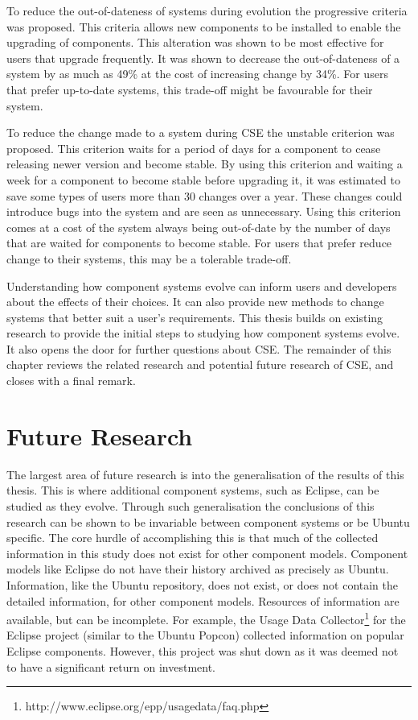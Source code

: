 To reduce the out-of-dateness of systems during evolution the progressive criteria was proposed.
This criteria allows new components to be installed to enable the upgrading of components.
This alteration was shown to be most effective for users that upgrade frequently.
It was shown to decrease the out-of-dateness of a system by as much as 49\% at the cost of increasing change by 34\%.
For users that prefer up-to-date systems, this trade-off might be favourable for their system.

To reduce the change made to a system during CSE the unstable criterion was proposed.
This criterion waits for a period of days for a component to cease releasing newer version and become stable.
By using this criterion and waiting a week for a component to become stable before upgrading it, it was estimated to save some types of users more than 30 changes over a year.
These changes could introduce bugs into the system and are seen as unnecessary. 
Using this criterion comes at a cost of the system always being out-of-date by the number of days that are waited for components to become stable.
For users that prefer reduce change to their systems, this may be a tolerable trade-off.

Understanding how component systems evolve can inform users and developers about the effects of their choices.
It can also provide new methods to change systems that better suit a user's requirements.
This thesis builds on existing research to provide the initial steps to studying how component systems evolve.
It also opens the door for further questions about CSE.
The remainder of this chapter reviews the related research and potential future research of CSE, and closes with a final remark. 

\section{Future Research}
The largest area of future research is into the generalisation of the results of this thesis.
This is where additional component systems, such as Eclipse, can be studied as they evolve. 
Through such generalisation the conclusions of this research can be shown to be invariable between component systems or be Ubuntu specific.
The core hurdle of accomplishing this is that much of the collected information in this study does not exist for other component models.
Component models like Eclipse do not have their history archived as precisely as Ubuntu.
Information, like the Ubuntu repository, does not exist, or does not contain the detailed information, for other component models.
Resources of information are available, but can be incomplete.
For example, the Usage Data Collector\footnote{http://www.eclipse.org/epp/usagedata/faq.php} for the Eclipse project (similar to the Ubuntu Popcon) collected information on popular Eclipse components. 
However, this project was shut down as it was deemed not to have a significant return on investment. 
 
